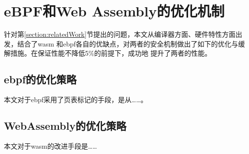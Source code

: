 \section{eBPF和Web Assembly的优化机制}
\label{section:optimizations}
    针对第\ref{section:relatedWork}节提出的问题，本文从编译器方面、硬件特性方面出发，结合了wasm
    和ebpf各自的优缺点，对两者的安全机制做出了如下的优化与缓解措施。在保证性能不降低5\%的前提下，成功地
    提升了两者的性能。
\subsection{ebpf的优化策略}
    本文对于ebpf采用了页表标记的手段，是从……。
\subsection{WebAssembly的优化策略}
    本文对于wasm的改进手段是……